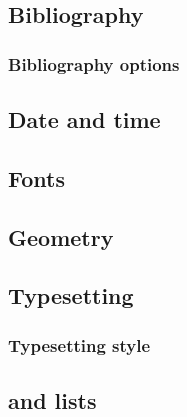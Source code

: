     \subsection{Bibliography}
    \label{sec:tutorial/preamble/bib}
    
    
        \subsubsection{Bibliography options}
        \label{sec:tutorial/preamble/bib/options}
        
    
    \subsection{Date and time}
    \label{sec:tutorial/preamble/datetime}
    
    
    \subsection{Fonts}
    \label{sec:tutorial/preamble/font}
    
    
    \subsection{Geometry}
    \label{sec:tutorial/preamble/geometry}
    
    
    \subsection{Typesetting}
    \label{sec:tutorial/preamble/listing}
    
    
        \subsubsection{Typesetting style}
        \label{sec:tutorial/preamble/listing/style}
        
    
    \subsection*{\thesubsection\hspace{1em} and lists}
    \label{sec:tutorial/preamble/toc}
    
    
